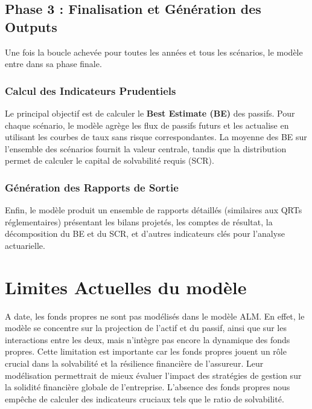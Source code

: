 \subsection{Phase 3 : Finalisation et Génération des Outputs}

Une fois la boucle achevée pour toutes les années et tous les scénarios, le modèle entre dans sa phase finale.

\subsubsection{Calcul des Indicateurs Prudentiels}
Le principal objectif est de calculer le \textbf{Best Estimate (BE)} des passifs. Pour chaque scénario, le modèle agrège les flux de passifs futurs et les actualise en utilisant les courbes de taux sans risque correspondantes. La moyenne des BE sur l'ensemble des scénarios fournit la valeur centrale, tandis que la distribution permet de calculer le capital de solvabilité requis (SCR).

\subsubsection{Génération des Rapports de Sortie}
Enfin, le modèle produit un ensemble de rapports détaillés (similaires aux QRTs réglementaires) présentant les bilans projetés, les comptes de résultat, la décomposition du BE et du SCR, et d'autres indicateurs clés pour l'analyse actuarielle.

\section{Limites Actuelles du modèle}
A date, les fonds propres ne sont pas modélisés dans le modèle ALM. En effet, le modèle se concentre sur la projection de l'actif et du passif, ainsi que sur les interactions entre les deux, mais n'intègre pas encore la dynamique des fonds propres. Cette limitation est importante car les fonds propres jouent un rôle crucial dans la solvabilité et la résilience financière de l'assureur. Leur modélisation permettrait de mieux évaluer l'impact des stratégies de gestion sur la solidité financière globale de l'entreprise. L'absence des fonds propres nous empêche de calculer des indicateurs cruciaux tels que le ratio de solvabilité.



